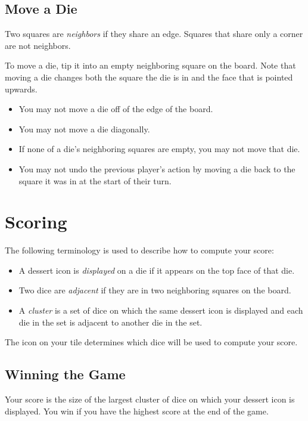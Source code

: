 \documentclass[11pt, parskip=half]{scrartcl}
\begin{document}
\newpage
\subsection*{Move a Die}
Two squares are \emph{neighbors} if they share an edge. Squares that share only a corner are not neighbors.

To move a die, tip it into an empty neighboring square on the board. Note that moving a die changes both the square the die is in and the face that is pointed upwards.

\begin{itemize}[leftmargin=*]
    \item You may not move a die off of the edge of the board.
    \item You may not move a die diagonally.
    \item If none of a die's neighboring squares are empty, you may not move that die.
    \item You may not undo the previous player's action by moving a die back to the square it was in at the start of their turn.
\end{itemize}

\newpage
\section*{Scoring}
The following terminology is used to describe how to compute your score:
\begin{itemize}[leftmargin=*]
	\item A dessert icon is \emph{displayed} on a die if it appears on the top face of that die.%
    \item Two dice are \emph{adjacent} if they are in two neighboring squares on the board.
    \item A \emph{cluster} is a set of dice on which the same dessert icon is displayed and each die in the set is adjacent to another die in the set. 
\end{itemize}

The icon on your tile determines which dice will be used to compute your score.

\newpage
\subsection*{Winning the Game}
Your score is the size of the largest cluster of dice on which your dessert icon is displayed. You win if you have the highest score at the end of the game.
\end{document}
